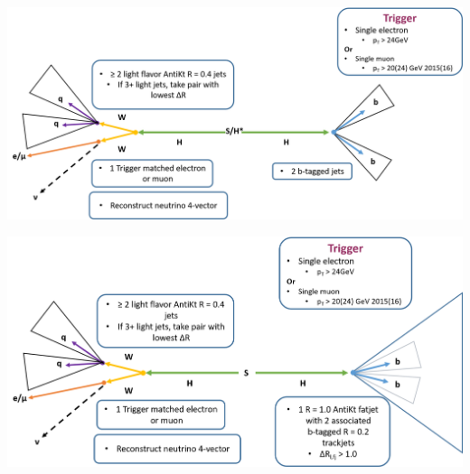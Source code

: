 \documentclass{beamer}
\newcommand*{\header}[1]{\fontsize{16}{8}\selectfont \textbf{{\color{MyPurple}{#1}}}}
\begin{document}
\begin{frame}
\begin{center}
\header{Resolved Event Selection}
\end{center}
\begin{center}
\includegraphics[width=1\textwidth]{figures/resolvedv2}
\end{center}
\end{frame}

\begin{frame}
\begin{center}
\header{Boosted Event Selection}
\end{center}
\begin{center}
\includegraphics[width=1\textwidth]{figures/boostedv2}
\end{center}
\end{frame}
\end{document}
